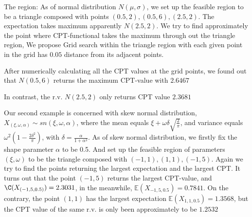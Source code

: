 The region:
As of normal distribution $N(\mu, \sigma)$, we set up the feasible region to be a triangle composed with points
$(0.5,2), (0.5,6), (2.5,2)$. The expectation takes maximum apparently $N (2.5, 2)$. 
We try to find approximately the point where CPT-functional takes the maximum through out the triangle region,
We propose Grid search within the triangle region with each given point in the 
grid has $0.05$ distance from its adjacent points.

After numerically calculating all the CPT values at the grid points, we found out that  $N(0.5, 6)$ returns the maximum CPT-value with $2.6467$

In contrast, the r.v. $N (2.5, 2)$ only returns CPT value $2.3681$

Our second example is concerned with skew normal distribution, 
$X_{(\xi, \omega, \alpha)} \sim sn(\xi, \omega, \alpha)$, where the mean equals 
$\xi + \omega \delta \sqrt{\frac{2}{\pi}}$, and variance equals 
$\omega^2(1 - \frac{2\delta^2}{\pi})$, with $\delta = \frac{\alpha}{1 + \alpha^2}$.
As of skew normal distribution, we firstly fix the shape parameter $\alpha$ to be 0.5. And set up the feasible region of parameters $(\xi, \omega) $ to be the triangle composed with $(-1,1), (1,1), (-1,5)$.  Again we try to find the points returning the largest expectation and the largest CPT.
It turns out that the point $(-1,5)$ returns the largest CPT-value, and $\C(X_{(-1,5,0.5)}) = 2.3031$, in the meanwhile,
$\mathbb{E}(X_{-1,5,0.5}) = 0.7841$.
On the contrary, the point $(1,1)$ has the largest expectation $\mathbb{E}(X_{1,1,0.5}) = 1.3568$, but the CPT value of the same r.v. is only been approximately to be $1.2532$
